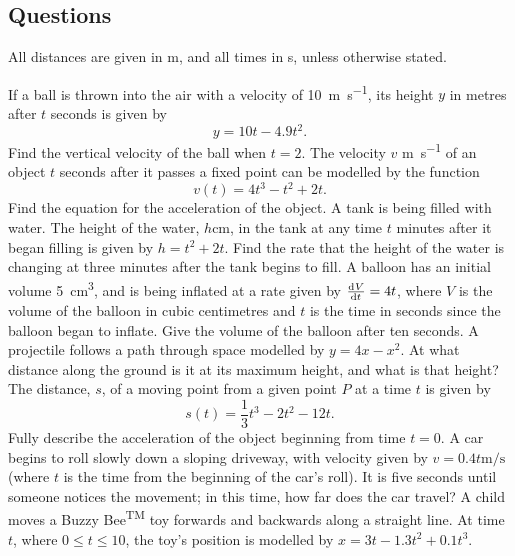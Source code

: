 \subsection*{Questions}
All distances are given in \si{\metre}, and all times in \si{\second}, unless otherwise stated.
\begin{questions}
  \question If a ball is thrown into the air with a velocity of \SI{10}{\metre\per\second},
            its height $ y $ in metres after $ t $ seconds is given by
            \begin{equation}
              y = 10t - 4.9t^2.
            \end{equation}
            Find the vertical velocity of the ball when $ t = 2 $.
  \question The velocity $ v $ \si{\metre\per\second} of an object $ t $ seconds after it passes
            a fixed point can be modelled by the function
            \begin{displaymath}
              v(t) = 4t^3 - t^2 + 2t.
            \end{displaymath}
            Find the equation for the acceleration of the object.
  \question A tank is being filled with water. The height of the water, $ h \si{\centi\metre} $, in the tank at any time $ t $
            minutes after it began filling is given by $ h = t^2 + 2t $. Find the rate that the height of the water is changing
            at three minutes after the tank begins to fill.
  \question A balloon has an initial volume \SI{5}{\centi\metre\cubed}, and is being inflated at a rate given by $ \od{V}{t} = 4t $,
            where $ V $ is the volume of the balloon in cubic centimetres and $ t $ is the time in seconds since the balloon began to
            inflate. Give the volume of the balloon after ten seconds.
  \question A projectile follows a path through space modelled by $ y = 4x - x^2 $. At what distance
            along the ground is it at its maximum height, and what is that height?
  \question The distance, $ s $, of a moving point from a given point $ P $ at a time $ t $ is given by
            \begin{displaymath}
              s(t) = \frac{1}{3}t^3 - 2t^2 - 12t.
            \end{displaymath}
            Fully describe the acceleration of the object beginning from time $ t = 0 $.
  \question A car begins to roll slowly down a sloping driveway, with velocity given by $ v = 0.4t\si{\metre\per\second} $ (where $ t $ is the
            time from the beginning of the car's roll). It is five seconds until someone notices the movement; in this time, how far
            does the car travel?
  \question A child moves a Buzzy Bee\textsuperscript{TM} toy forwards and backwards along a straight line. At time $ t $,
            where $ 0 \leq t \leq 10 $, the toy's position is modelled by $ x = 3t - 1.3t^2 + 0.1t^3 $.
    \begin{parts}

\end{parts}
\end{questions}
